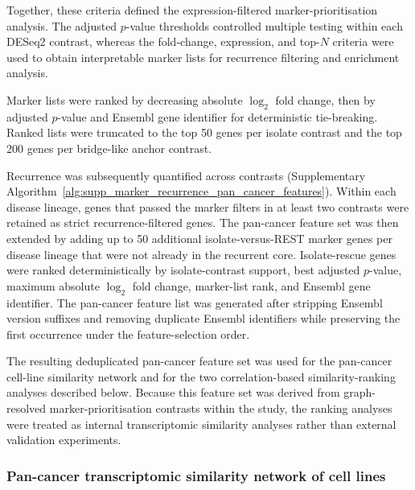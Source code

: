Together, these criteria defined the expression-filtered marker-prioritisation
analysis. The adjusted \(p\)-value thresholds controlled multiple testing within
each DESeq2 contrast, whereas the fold-change, expression, and top-\(N\)
criteria were used to obtain interpretable marker lists for recurrence filtering
and enrichment analysis.

Marker lists were ranked by decreasing absolute \(\log_2\) fold change,
then by adjusted \(p\)-value and Ensembl gene identifier for deterministic
tie-breaking. Ranked lists were truncated to the top 50 genes per isolate
contrast and the top 200 genes per bridge-like anchor contrast.

Recurrence was subsequently quantified across contrasts (Supplementary
Algorithm~\ref{alg:supp_marker_recurrence_pan_cancer_features}). Within each
disease lineage, genes that passed the marker filters in at least two contrasts
were retained as strict recurrence-filtered genes. The pan-cancer feature set
was then extended by adding up to 50 additional isolate-versus-REST marker genes
per disease lineage that were not already in the recurrent core. Isolate-rescue
genes were ranked deterministically by isolate-contrast support, best adjusted
$p$-value, maximum absolute $\log_{2}$ fold change, marker-list rank, and
Ensembl gene identifier. The pan-cancer feature list was generated after
stripping Ensembl version suffixes and removing duplicate Ensembl identifiers
while preserving the first occurrence under the feature-selection order.

The resulting deduplicated pan-cancer feature set was used for the pan-cancer
cell-line similarity network and for the two correlation-based
similarity-ranking analyses described below. Because this feature set was
derived from graph-resolved marker-prioritisation contrasts within the study,
the ranking analyses were treated as internal transcriptomic similarity
analyses rather than external validation experiments.

\subsubsection{Pan-cancer transcriptomic similarity network of cell lines}

